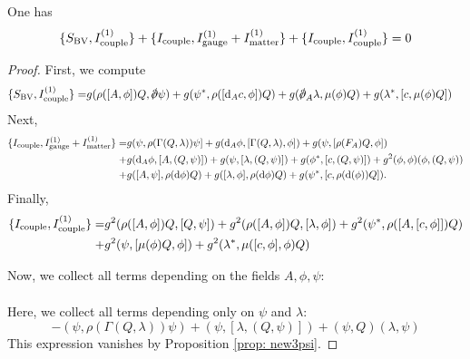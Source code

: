 \documentclass[10pt, oneside]{article}
\begin{document}
\begin{lem} One has
\[
\{S_{\rm BV} , I^{(1)}_{\rm couple}\} + \{I_{\rm couple}, I^{(1)}_{\rm gauge} + I^{(1)}_{\rm matter}\} + \{I_{\rm couple}, I^{(1)}_{\rm couple}\}  =  0 
\]
\end{lem}
\begin{proof}
First, we compute
\begin{align*}
\{S_{\rm BV} , I^{(1)}_{\rm couple}\} = & g (\rho([A, \phi]) Q, \sd \dd \psi) + g (\psi^*, \rho([\d_A c, \phi]) Q) + g (\sd \dd_A \lambda, \mu(\phi) Q) + g (\lambda^*, [c, \mu(\phi) Q]) 
\end{align*}
Next,
\begin{align*}
\{I_{\rm couple} , I^{(1)}_{\rm gauge} + I^{(1)}_{\rm matter}\} = & g (\psi, \rho(\Gamma(Q, \lambda)) \psi] + g ({\rm d}_A \phi, [\Gamma(Q, \lambda), \phi]) + g (\psi, [\rho(F_A) Q, \phi]) \\ + & g ({\rm d}_A \phi, [A, (Q, \psi)]) + g (\psi, [\lambda, (Q, \psi)]) + g (\phi^*, [c, (Q,\psi)]) + g^2 (\phi, \phi) (\phi, (Q, \psi)) \\ + & g ([A, \psi] , \rho({\rm d} \phi)Q) + g ([\lambda, \phi] , \rho ({\rm d} \phi) Q) + g (\psi^*, [c , \rho({\rm d}(\phi)) Q]) . 
\end{align*}
Finally,
\begin{align*}
\{I_{\rm couple}, I^{(1)}_{\rm couple}\} = & g^2 (\rho([A,\phi]) Q, [Q,\psi]) + g^2 (\rho([A,\phi]) Q, [\lambda, \phi]) + g^2 (\psi^*, \rho([A, [c,\phi]]) Q) \\ + & g^2 (\psi, [\mu(\phi) Q, \phi]) + g^2 (\lambda^*, \mu([c,\phi], \phi) Q)
\end{align*}

Now, we collect all terms depending on the fields $A, \phi, \psi$:
\begin{align*}
\end{align*} 

Here, we collect all terms depending only on $\psi$ and $\lambda$:
\[
- (\psi, \rho(\Gamma(Q, \lambda)) \psi) + (\psi, [\lambda, (Q, \psi)]) + (\psi, Q) (\lambda, \psi)
\]
This expression vanishes by Proposition \ref{prop: new3psi}.
\end{proof}
\end{document}
